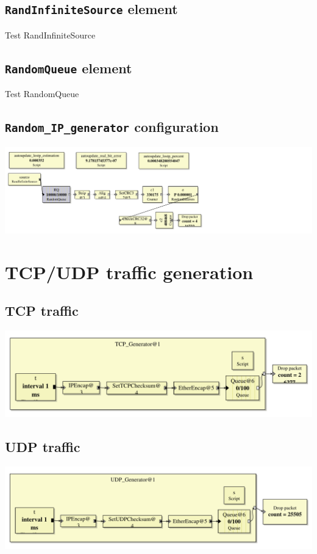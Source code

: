 \documentclass[a4paper]{article}
\begin{document}
  \subsection{\texttt{RandInfiniteSource} element}
  Test RandInfiniteSource
  \subsection{\texttt{RandomQueue} element}
  Test RandomQueue
  \subsection{\texttt{Random\_IP\_generator} configuration}
  \begin{center}
	  \includegraphics[scale=0.55]{../1-test-config/Random_IP_generator.pdf}
	  \label{fig:randomipgenerator}
  \end{center}
   
  \section{TCP/UDP traffic generation}
  \subsection{TCP traffic}
  \begin{center}
	  \includegraphics[scale=0.55]{../2-tcp-udp-generation/TCP_Source.pdf}
	  \label{fig:tcpsource}
  \end{center}
  \subsection{UDP traffic}
    \begin{center}
	  \includegraphics[scale=0.55]{../2-tcp-udp-generation/UDP_Source.pdf}
	  \label{fig:udpsource}
  \end{center}
\end{document}
